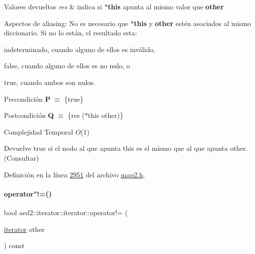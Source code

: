 \begin{DoxyRetVals}{Valores devueltos}
{\em res} & indica si {\bfseries $\ast$this} apunta al mismo valor que {\bfseries other}\\
\hline
\end{DoxyRetVals}
\begin{DoxyParagraph}{Aspectos de aliasing\+:}
No es necesario que {\bfseries $\ast$this} y {\bfseries other} estén asociados al mismo diccionario. Si no lo están, el resultado esta\+:
\begin{DoxyItemize}
\item indeterminado, cuando alguno de ellos es inválido,
\item false, cuando alguno de ellos es no nulo, o
\item true, cuando ambos son nulos.
\end{DoxyItemize}
\end{DoxyParagraph}
\begin{DoxyPrecond}{Precondición}
{\bfseries P} $\equiv$ \{true\} 
\end{DoxyPrecond}
\begin{DoxyPostcond}{Postcondición}
{\bfseries Q} $\equiv$ \{res  ($\ast$this  other)\}
\end{DoxyPostcond}

\begin{DoxyDescription}
\item[Complejidad Temporal]$O$(1)
\end{DoxyDescription}

Devuelve true si el nodo al que apunta this es el mismo que al que apunta other. (Consultar) 

Definición en la línea \hyperlink{map2_8h_source_l02951}{2951} del archivo \hyperlink{map2_8h_source}{map2.\+h}.

\mbox{\label{classaed2_1_1iterator_1_1iterator_a1c42a3d770db85a6b25abf05e7fa1683_a1c42a3d770db85a6b25abf05e7fa1683}} 
\paragraph{\texorpdfstring{operator"!=()}{operator!=()}}
{\footnotesize\ttfamily bool aed2\+::iterator\+::iterator\+::operator!= (\begin{DoxyParamCaption}\item[{\hyperlink{classaed2_1_1iterator_1_1iterator}{iterator}}]{other }\end{DoxyParamCaption}) const\hspace{0.3cm}{\ttfamily [inline]}}



